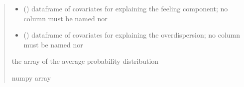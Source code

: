 \documentclass[letterpaper,10pt,english]{sphinxmanual}
\begin{document}
\begin{fulllineitems}
\begin{quote}
\begin{description}
\begin{itemize}
\item {} 
\sphinxAtStartPar
{} () \textendash{} dataframe of covariates for explaining the feeling component;
no column must be named  nor 

\item {} 
\sphinxAtStartPar
{} () \textendash{} dataframe of covariates for explaining the overdispersion;
no column must be named  nor 

\end{itemize}

\sphinxAtStartPar
the array of the average probability distribution

\sphinxAtStartPar
numpy array

\end{description}\end{quote}

\end{fulllineitems}

\end{document}
